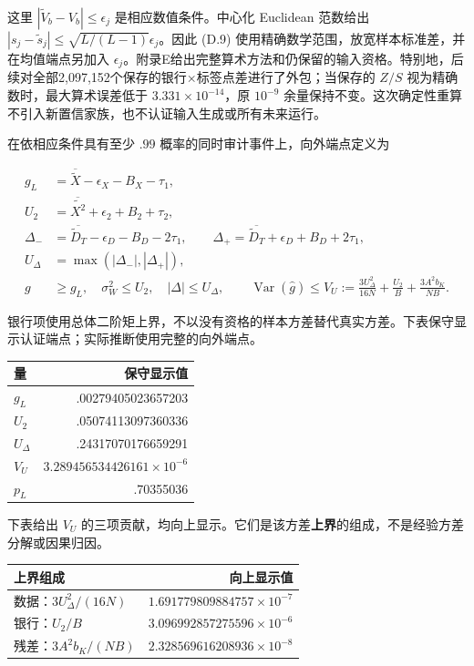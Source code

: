 \documentclass[11pt,a4paper]{article}
\begin{document}
这里 \(|\widetilde V_b-V_b|\le\epsilon_j\) 是相应数值条件。中心化
Euclidean 范数给出
\(|s_j-\widetilde s_j|\le\sqrt{L/(L-1)}\epsilon_j\)。因此 (D.9)
使用精确数学范围，放宽样本标准差，并在均值端点另加入
\(\epsilon_j\)。附录E给出完整算术方法和仍保留的输入资格。特别地，后续对全部2,097,152个保存的银行×标签点差进行了外包；当保存的
\(Z/S\) 视为精确数时，最大算术误差低于 \(3.331\times10^{-14}\)，原
\(10^{-9}\)
余量保持不变。这次确定性重算不引入新置信家族，也不认证输入生成或所有未来运行。

在依相应条件具有至少 \(.99\) 概率的同时审计事件上，向外端点定义为

\[
\begin{aligned}
g_L&=\overline{\widetilde X}-\epsilon_X-B_X-\tau_1,\\
U_2&=\overline{\widetilde{X^2}}+\epsilon_2+B_2+\tau_2,\\
\Delta_-&=\overline{\widetilde D_T}-\epsilon_D-B_D-2\tau_1,\qquad
\Delta_+=\overline{\widetilde D_T}+\epsilon_D+B_D+2\tau_1,\\
U_\Delta&=\max(|\Delta_-|,|\Delta_+|),\\
g&\ge g_L,\quad \sigma_W^2\le U_2,\quad |\Delta|\le U_\Delta,\qquad
\operatorname{Var}(\widehat g)\le V_U:=
\frac{3U_\Delta^2}{16N}+\frac{U_2}{B}+\frac{3A^2b_K}{NB}.
\end{aligned}
\tag{D.10}
\]

银行项使用总体二阶矩上界，不以没有资格的样本方差替代真实方差。下表保守显示认证端点；实际推断使用完整的向外端点。

\begin{longtable}[]{@{}lr@{}}
\toprule\noalign{}
量 & 保守显示值 \\
\midrule\noalign{}
\endhead
\bottomrule\noalign{}
\endlastfoot
\(g_L\) & .00279405023657203 \\
\(U_2\) & .05074113097360336 \\
\(U_\Delta\) & .24317070176659291 \\
\(V_U\) & \(3.289456534426161\times10^{-6}\) \\
\(p_L\) & .70355036 \\
\end{longtable}

下表给出 \(V_U\)
的三项贡献，均向上显示。它们是该方差\textbf{上界}的组成，不是经验方差分解或因果归因。

\begin{longtable}[]{@{}lr@{}}
\toprule\noalign{}
上界组成 & 向上显示值 \\
\midrule\noalign{}
\endhead
\bottomrule\noalign{}
\endlastfoot
数据：\(3U_\Delta^2/(16N)\) & \(1.691779809884757\times10^{-7}\) \\
银行：\(U_2/B\) & \(3.096992857275596\times10^{-6}\) \\
残差：\(3A^2b_K/(NB)\) & \(2.328569616208936\times10^{-8}\) \\
\end{longtable}
\end{document}
